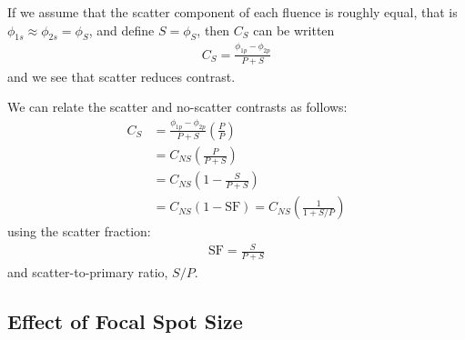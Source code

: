 \documentclass[mphy386-notes.tex]{subfiles}
\begin{document}
If we assume that the scatter component of each fluence is roughly equal, that is $\phi_{1s} \approx \phi_{2s} = \phi_S$, and define $S = \phi_S$, then $C_S$ can be written
\begin{align}
  C_S = \frac{\phi_{1p} - \phi_{2p}}{P + S}
\end{align}
and we see that scatter reduces contrast.

We can relate the scatter and no-scatter contrasts as follows:
\begin{align}
  C_S &= \frac{\phi_{1p} - \phi_{2p}}{P + S}\left(\frac{P}{P}\right)\\
      &= C_{NS}\left(\frac{P}{P + S}\right)\\
      &= C_{NS}\left(1 - \frac{S}{P + S}\right) \\
      &= C_{NS}(1 - \text{SF}) = C_{NS}\left(\frac{1}{1 + S/P}\right)
\end{align}
using the scatter fraction:
\begin{align}
  \text{SF} = \frac{S}{P + S}
\end{align}
and scatter-to-primary ratio, $S/P$. 


\subsection{Effect of Focal Spot Size}


\pagebreak
\end{document}
